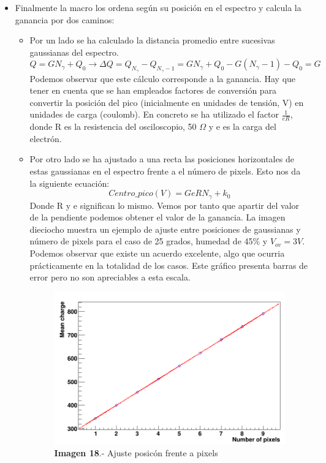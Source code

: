 \documentclass[11pt, a4paper]{article}
\begin{document}
\begin{itemize}
\item {} Finalmente la macro los ordena según su posición en el espectro y calcula la ganancia por dos caminos:
	\begin{itemize}

	\item {} Por un lado se ha calculado la distancia promedio entre sucesivas gaussianas del espectro. 
	$$Q = G N_\gamma + Q_0 \longrightarrow \Delta Q= Q_{N_\gamma} - Q_{N_\gamma -1}=G N_\gamma+ Q_0 - G(N_		\gamma -1) - Q_0 = G$$
	Podemos observar que este cálculo corresponde a la ganancia. Hay que tener en cuenta que se han 			empleados factores de conversión para convertir la posición del pico (inicialmente en unidades de			tensión, V) en unidades de carga (coulomb). En concreto se ha utilizado el factor $\frac{1}{eR}$, 			donde R es la resistencia del osciloscopio, 50 $\Omega$ y e es la carga del electrón.
	
	\item {} Por otro lado se ha ajustado a una recta las posiciones horizontales de estas gaussianas en el 	espectro frente a el número de pixels. Esto nos da la siguiente ecuación:
	$$Centro\_pico(V) = GeRN_\gamma + k_0$$	
	Donde R y e significan lo mismo. Vemos por tanto que apartir del valor de la pendiente podemos obtener 		el valor de la ganancia. La imagen dieciocho muestra un ejemplo de ajuste entre posiciones de 				gaussianas y número de pixels para el caso de 25 grados, humedad de 45\% y $V_{ov}=3V$. Podemos 			observar que existe	un acuerdo excelente, algo que ocurria prácticamente en la totalidad de los casos. 		Este gráfico presenta barras de error pero no son apreciables a esta escala.
		
	\begin{figure}[hbtp]
		\centering
		\includegraphics[scale=0.2]{FitPosicionPixels.png}
		\caption{\textbf{Imagen 18}.- Ajuste posicón frente a pixels}
		\end{figure}
			

\end{itemize}
\end{itemize}
\end{document}
